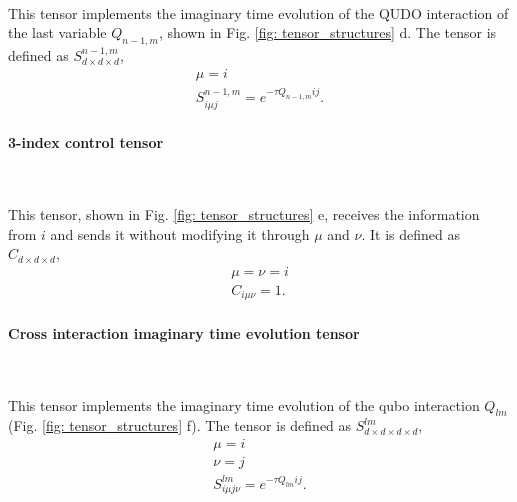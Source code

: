 \documentclass[%
 reprint,
 amsmath,amssymb,
 aps,
 pra,showkeys,
]{revtex4-2}
\begin{document}
$ $


This tensor implements the imaginary time evolution of the QUDO interaction of the last variable $Q_{n-1,m}$, shown in Fig. \ref{fig: tensor_structures} d. The tensor is defined as $S^{n-1,m}_{d\times d \times d}$,  
\begin{equation}
    \begin{gathered}
        \mu = i \\
        S^{n-1,m}_{i\mu j} = e^{- \tau Q_{n-1,m} ij}.
    \end{gathered}
\end{equation}

\paragraph{3-index control tensor}

$ $


This tensor, shown in Fig. \ref{fig: tensor_structures} e, receives the information from $i$ and sends it without modifying it through $\mu$ and $\nu$. It is defined as $C_{d\times d\times d}$,
\begin{equation}
    \begin{gathered}
        \mu = \nu = i \\
        C_{i\mu \nu} = 1.
    \end{gathered}
\end{equation}



\paragraph{Cross interaction imaginary time evolution tensor}

$ $


This tensor implements the imaginary time evolution of the qubo interaction $Q_{lm}$ (Fig. \ref{fig: tensor_structures} f). The tensor is defined as $S^{lm}_{d\times d \times d \times d}$,  
\begin{equation}
    \begin{gathered}
        \mu = i \\
        \nu = j\\
        S^{lm}_{i\mu j \nu} = e^{- \tau Q_{lm} ij}.
    \end{gathered}
\end{equation}
\end{document}
